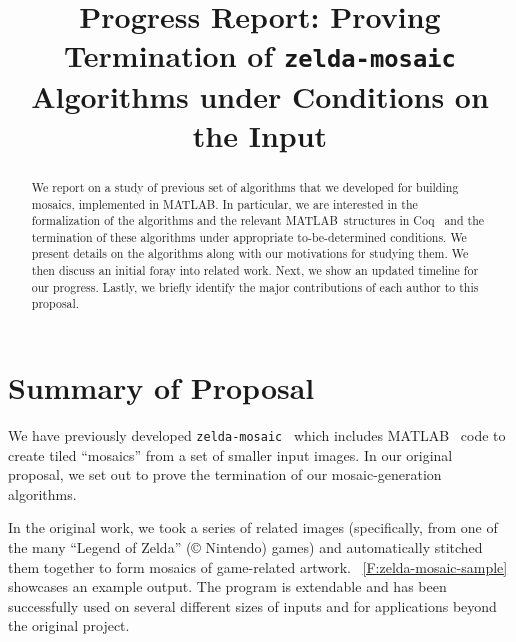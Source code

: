 \documentclass[11pt,conference]{IEEEtran}
\newcommand{\matlab}{MATLAB}
\begin{document}
\title{Progress Report: Proving Termination of \texttt{zelda-mosaic} Algorithms under Conditions on the Input}

\author{
\and
{}
}

\maketitle

\begin{abstract}
    We report on a study of previous set of algorithms that we developed for
    building mosaics, implemented in \matlab\@. In particular, we are interested
    in the formalization of the algorithms and the relevant \matlab\ structures
    in Coq~\cite{Coq} and the termination of these algorithms under appropriate
    to-be-determined conditions. We present details on the algorithms along with
    our motivations for studying them. We then discuss an initial foray into
    related work. Next, we show an updated timeline for our progress. Lastly, we
    briefly identify the major contributions of each author to this proposal.
\end{abstract}


\section{Summary of Proposal}

We have previously developed \texttt{zelda-mosaic}~\cite{zelda_mosaic} which
includes \matlab~\cite{matlab} code to create tiled ``mosaics'' from a set of
smaller input images. In our original proposal, we set out to prove the
termination of our mosaic-generation algorithms.

In the original work, we took a series of related images (specifically, from one
of the many ``Legend of Zelda'' ({\copyright} Nintendo) games) and automatically
stitched them together to form mosaics of game-related artwork.
\figurename~\ref{F:zelda-mosaic-sample} showcases an example output. The program
is extendable and has been successfully used on several different sizes of
inputs and for applications beyond the original project.
\end{document}
